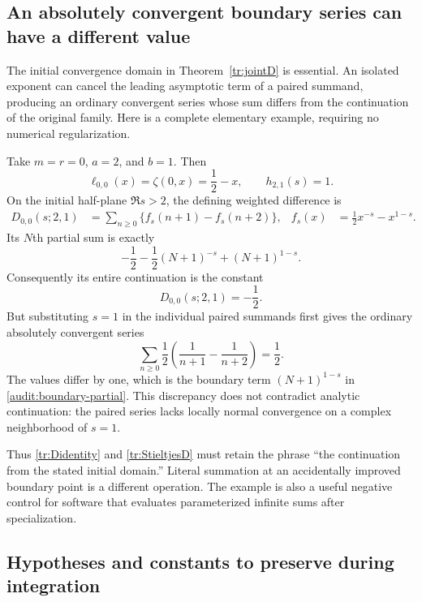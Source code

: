 \subsection{An absolutely convergent boundary series can have a different value}
\label{audit:boundary}

The initial convergence domain in Theorem~\ref{tr:jointD} is essential.
An isolated exponent can cancel the leading asymptotic term of a
paired summand, producing an ordinary convergent series whose sum differs
from the continuation of the original family.  Here is a complete
elementary example, requiring no numerical regularization.

Take $m=r=0$, $a=2$, and $b=1$.  Then
\[
 \ell_{0,0}(x)=\zeta(0,x)=\frac12-x,
 \qquad h_{2,1}(s)=1.
\]
On the initial half-plane $\Re s>2$, the defining weighted difference
is
\begin{align}
 D_{0,0}(s;2,1)
 &=\sum_{n\geq0}\{f_s(n+1)-f_s(n+2)\},
 & f_s(x)&=\frac12x^{-s}-x^{1-s}.
 \label{audit:telescoping}
\end{align}
Its $N$th partial sum is exactly
\begin{equation}\label{audit:boundary-partial}
 -\frac12-\frac12(N+1)^{-s}+(N+1)^{1-s}.
\end{equation}
Consequently its entire continuation is the constant
\begin{equation}\label{audit:continued}
                         D_{0,0}(s;2,1)=-\frac12.
\end{equation}
But substituting $s=1$ in the individual paired summands first gives
the ordinary absolutely convergent series
\begin{equation}\label{audit:literal}
 \sum_{n\geq0}\frac12
       \left(\frac1{n+1}-\frac1{n+2}\right)=\frac12.
\end{equation}
The values differ by one, which is the boundary term
$(N+1)^{1-s}$ in \eqref{audit:boundary-partial}.  This discrepancy
does not contradict analytic continuation: the paired series lacks
locally normal convergence on a complex neighborhood of $s=1$.

Thus \eqref{tr:Didentity} and \eqref{tr:StieltjesD} must retain the
phrase ``the continuation from the stated initial domain.''  Literal
summation at an accidentally improved boundary point is a different
operation.  The example is also a useful negative control for software
that evaluates parameterized infinite sums after specialization.

\subsection{Hypotheses and constants to preserve during integration}

